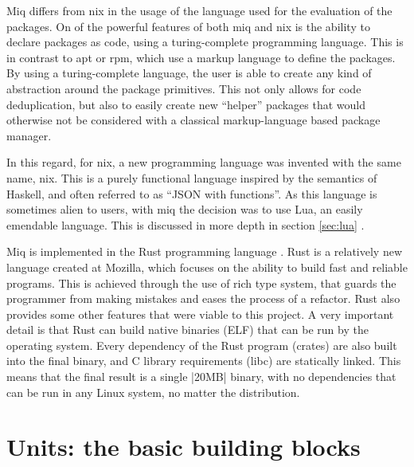 Miq differs from nix in the usage of the language used for
the evaluation of the packages. On of the powerful features
of both miq and nix is the ability to declare packages as
code, using a turing-complete programming language. This is
in contrast to apt or rpm, which use a markup language to
define the packages. By using a turing-complete language,
the user is able to create any kind of abstraction around
the package primitives. This not only allows for code
deduplication, but also to easily create new ``helper''
packages that would otherwise not be considered with a
classical markup-language based package manager.

In this regard, for nix, a new programming language was
invented with the same name, nix. This is a purely
functional language inspired by the semantics of Haskell, and
often referred to as ``JSON with functions''. As this
language is sometimes alien to users, with miq the decision
was to use Lua, an easily emendable language. This is
discussed in more depth in section \ref{sec:lua} .

Miq is implemented in the Rust programming language
\cite{RustProgrammingLanguage} . Rust is a relatively new
language created at Mozilla, which focuses on the ability to
build fast and reliable programs. This is achieved through
the use of rich type system, that guards the programmer from
making mistakes and eases the process of a refactor. Rust
also provides some other features that were viable to this
project. A very important detail is that Rust can build
native binaries (ELF) that can be run by the operating
system. Every dependency of the Rust program (crates) are
also built into the final binary, and C library requirements
(libc) are statically linked. This means that the final
result is a single |20MB| binary, with no dependencies that can be
run in any Linux system, no matter the distribution.

\section{Units: the basic building blocks}
\label{sec:unit}

